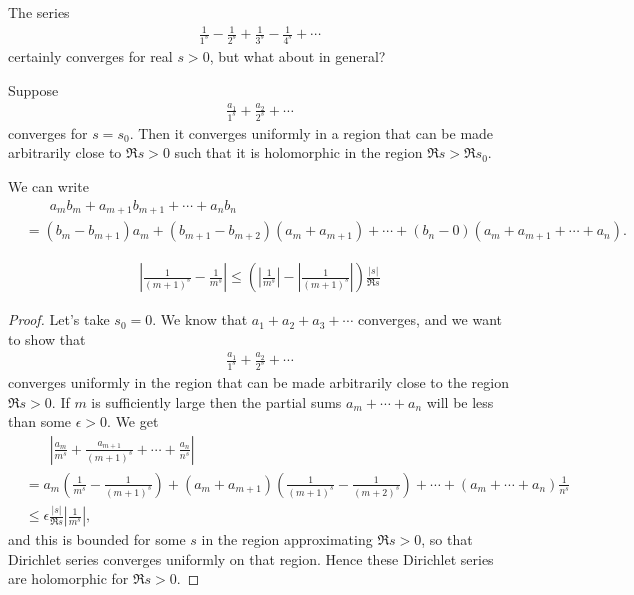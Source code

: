 \documentclass[11pt, oneside,margin=1in]{article}
\begin{document}
The series
\begin{align*}
	\frac{1}{1^s} - \frac{1}{2^s} + \frac{1}{3^s} -\frac{1}{4^s}+\cdots
\end{align*}
certainly converges for real $s>0$, but what about in general?

\begin{proposition}[ ]\label{}\text{}
Suppose \begin{align*}
	\frac{a_1}{1^s} + \frac{a_2}{2^s} + \cdots
\end{align*}
converges for $s=s_0$. Then it converges uniformly in a region that can be made arbitrarily close to $\Re s>0$ such that it is holomorphic in the region $\Re s>\Re s_0$.
\end{proposition}
\begin{remark}
	 We can write
	\begin{align*}
	&\phantom{=}\ \	a_mb_m+ a_{m+1} b_{m+1} + \cdots+a_nb_n\\ &= (b_m - b_{m+1}) a_m +  (b_{m+1} - b_{m+2}) (a_m + a_{m+1}) + \cdots +  (b_n - 0) (a_m + a_{m+1} + \cdots + a_n).
	\end{align*}
\end{remark}
\begin{remark}
	\begin{align*}
		\left\lvert \frac{1}{(m+1) ^s} - \frac{1}{m^s} \right\rvert \le \left(\left\lvert \frac{1}{m^s}  \right\rvert - \left\lvert \frac{1}{(m+1)^s} \right\rvert \right) \frac{\left\lvert s \right\rvert }{\Re s}
	\end{align*}
\end{remark}
\begin{proof}
Let's take $s_0=0$. We know that $a_1+a_2+a_3+\cdots$ converges, and we want to show that \begin{align*}
	\frac{a_1}{1^s} + \frac{a_2}{2^s} + \cdots
\end{align*}
converges uniformly in the region that can be made arbitrarily close to the region $\Re s > 0$. If $m$ is sufficiently large then the partial sums $a_m +\cdots +a_n$ will be less than some $\epsilon > 0$. We get 
\begin{align*}
	&\phantom{=}\ \ \left\lvert \frac{a_m}{m^s} + \frac{a_{m+1}}{(m+1)^s} + \cdots + \frac{a_n}{n^s} \right\rvert \\
	&= a_m \left( \frac{1}{m^s} - \frac{1}{(m+1)^s} \right) + (a_m + a_{m+1}) \left( \frac{1}{(m+1)^s} -  \frac{1}{(m+2)^s} \right) + \cdots + (a_m + \cdots + a_n)  \frac{1}{n^s}\\
	&\le \epsilon \frac{\left\lvert s \right\rvert }{\Re s} \left\lvert \frac{1}{m^s} \right\rvert, 
\end{align*}
and this is bounded for some $s$ in the region approximating $\Re s> 0 $, so that Dirichlet series converges uniformly on that region. Hence these Dirichlet series are holomorphic for $\Re s > 0$.
\end{proof}
\end{document}
